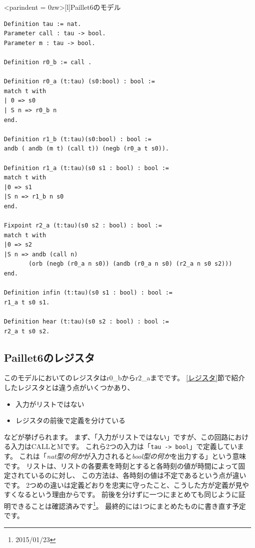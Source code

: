 \documentclass{jsbook}
\begin{document}
\begin{breakitembox}<parindent = 0zw>[l]{Paillet6のモデル}
  \begin{verbatim}
Definition tau := nat.
Parameter call : tau -> bool.
Parameter m : tau -> bool.

Definition r0_b := call .

Definition r0_a (t:tau) (s0:bool) : bool :=
match t with
| 0 => s0
| S n => r0_b n
end.

Definition r1_b (t:tau)(s0:bool) : bool :=
andb ( andb (m t) (call t)) (negb (r0_a t s0)).

Definition r1_a (t:tau)(s0 s1 : bool) : bool :=
match t with
|0 => s1
|S n => r1_b n s0
end.

Fixpoint r2_a (t:tau)(s0 s2 : bool) : bool :=
match t with
|0 => s2
|S n => andb (call n) 
       (orb (negb (r0_a n s0)) (andb (r0_a n s0) (r2_a n s0 s2)))
end.

Definition infin (t:tau)(s0 s1 : bool) : bool :=
r1_a t s0 s1.

Definition hear (t:tau)(s0 s2 : bool) : bool :=
r2_a t s0 s2.
  \end{verbatim}
\end{breakitembox}
\subsection*{Paillet6のレジスタ}
このモデルにおいてのレジスタはr0\_bからr2\_aまでです。
\ref{レジスタ}節で紹介したレジスタとは違う点がいくつかあり、
\begin{itemize}
\item 入力がリストではない
\item レジスタの前後で定義を分けている
\end{itemize}
などが挙げられます。
まず、「入力がリストではない」ですが、この回路における入力はCALLとMです。
これら2つの入力は「\verb|tau -> bool|」で定義しています。
これは「\emph{nat型の何か}が入力されると\emph{bool型の何か}を出力する」という意味です。
リストは、リストの各要素を時刻とすると各時刻の値が時間によって固定されているのに対し、
この方法は、各時刻の値は不定であるという点が違いです。
2つめの違いは定義どおりを忠実に守ったこと、こうした方が定義が見やすくなるという理由からです。
前後を分けずに一つにまとめても同じように証明できることは確認済みです\footnote{2015/01/23}。
最終的には1つにまとめたものに書き直す予定です。
\end{document}
